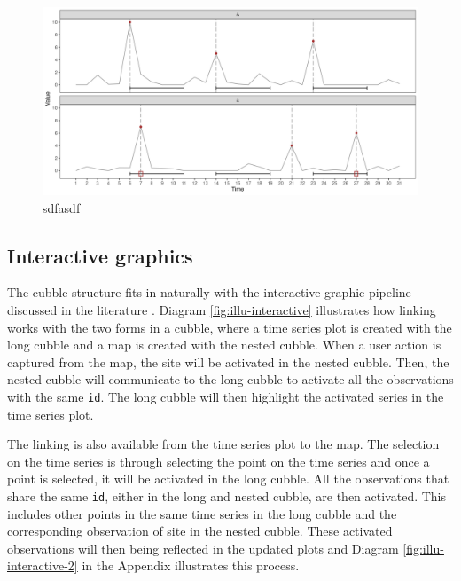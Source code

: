 \documentclass[
]{jss}
\begin{document}
\begin{CodeChunk}
\begin{figure}

{\centering \includegraphics[width=1\linewidth,height=0.3\textheight]{figures/illu-matching} 

}

\caption[sdfasdf]{sdfasdf}\label{fig:illu-matching}
\end{figure}
\end{CodeChunk}

\hypertarget{interactive-graphics}{%
\subsection{Interactive graphics}\label{interactive-graphics}}

The cubble structure fits in naturally with the interactive graphic
pipeline discussed in the literature
\citep{buja1988elements, buja1996interactive, sutherland2000orca, xie2014reactive, cheng2016enabling}.
Diagram \ref{fig:illu-interactive} illustrates how linking works with
the two forms in a cubble, where a time series plot is created with the
long cubble and a map is created with the nested cubble. When a user
action is captured from the map, the site will be activated in the
nested cubble. Then, the nested cubble will communicate to the long
cubble to activate all the observations with the same \texttt{id}. The
long cubble will then highlight the activated series in the time series
plot.

The linking is also available from the time series plot to the map. The
selection on the time series is through selecting the point on the time
series and once a point is selected, it will be activated in the long
cubble. All the observations that share the same \texttt{id}, either in
the long and nested cubble, are then activated. This includes other
points in the same time series in the long cubble and the corresponding
observation of site in the nested cubble. These activated observations
will then being reflected in the updated plots and Diagram
\ref{fig:illu-interactive-2} in the Appendix illustrates this process.
\end{document}
